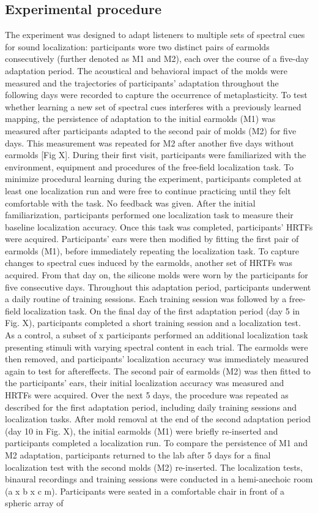 \subsection{Experimental procedure}
The experiment was designed to adapt listeners to multiple sets of spectral cues for sound localization: participants wore two distinct pairs of earmolds consecutively (further denoted as M1 and M2), each over the course of a five-day adaptation period. The acoustical and behavioral impact of the molds were measured and the trajectories of participants’ adaptation throughout the following days were recorded to capture the occurrence of metaplasticity. To test whether learning a new set of spectral cues interferes with a previously learned mapping, the persistence of adaptation to the initial earmolds (M1) was measured after participants adapted to the second pair of molds (M2) for five days. This measurement was repeated for M2 after another five days without earmolds [Fig X]. During their first visit, participants were familiarized with the environment, equipment and procedures of the free-field localization task. To minimize procedural learning during the experiment, participants completed at least one localization run and were free to continue practicing until they felt comfortable with the task. No feedback was given. After the initial familiarization, participants performed one localization task to measure their baseline localization accuracy. Once this task was completed, participants’ HRTFs were acquired. Participants’ ears were then modified by fitting the first pair of earmolds (M1), before immediately repeating the localization task. To capture changes to spectral cues induced by the earmolds, another set of HRTFs was acquired. From that day on, the silicone molds were worn by the participants for five consecutive days. Throughout this adaptation period, participants underwent a daily routine of training sessions. Each training session was followed by a free-field localization task. On the final day of the first adaptation period (day 5 in Fig. X), participants completed a short training session and a localization test. As a control, a subset of x participants performed an additional localization task presenting stimuli with varying spectral content in each trial. The earmolds were then removed, and participants’ localization accuracy was immediately measured again to test for aftereffects. The second pair of earmolds (M2) was then fitted to the participants’ ears, their initial localization accuracy was measured and HRTFs were acquired. Over the next 5 days, the procedure was repeated as described for the first adaptation period, including daily training sessions and localization tasks. After mold removal at the end of the second adaptation period (day 10 in Fig. X), the initial earmolds (M1) were briefly re-inserted and participants completed a localization run. To compare the persistence of M1 and M2 adaptation, participants returned to the lab after 5 days for a final localization test with the second molds (M2) re-inserted. The localization tests, binaural recordings and training sessions were conducted in a hemi-anechoic room (a x b x c m). Participants were seated in a comfortable chair in front of a spheric array of 